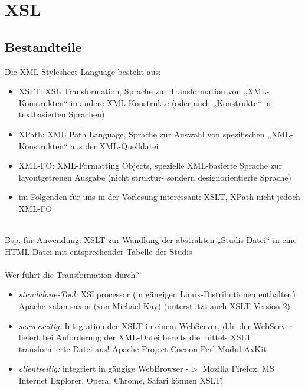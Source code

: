 \chapter{XSL}

\section{Bestandteile}
Die XML Stylesheet Language besteht aus:
\begin{itemize}
\item XSLT: XSL Transformation, Sprache zur Transformation von „XML-Konstrukten“ in andere XML-Konstrukte (oder auch „Konstrukte“ in textbasierten Sprachen)
\item XPath: XML Path Language, Sprache zur Auswahl von spezifischen „XML-Konstrukten“ aus der XML-Quelldatei
\item XML-FO: XML-Formatting Objects, spezielle XML-basierte Sprache zur layoutgetreuen Ausgabe (nicht struktur- sondern designorientierte Sprache)
\item im Folgenden für uns in der Vorlesung interessant: XSLT, XPath nicht jedoch XML-FO
\end{itemize}
\hspace*{0,5mm}\\

Bsp. für Anwendung: XSLT zur Wandlung der abstrakten „Studis-Datei“ in eine HTML-Datei mit entsprechender Tabelle der Studis\\
\\
Wer führt die Transformation durch?
\begin{itemize}
\item \emph{standalone-Tool:} XSLprocessor (in gängigen Linux-Distributionen enthalten) Apache xalan saxon (von Michael Kay) (unterstützt auch XSLT Version 2)
\item \emph{serverseitig:} Integration der XSLT in einem WebServer, d.h. der WebServer liefert			bei Anforderung der XML-Datei bereits die mittels XSLT transformierte Datei aus!
Apache Project Cocoon
Perl-Modul AxKit
\item \emph{clientseitig:} integriert in gängige WebBrowser -$>$ Mozilla Firefox, MS Internet Explorer, Opera, Chrome, Safari können XSLT!
\end{itemize}